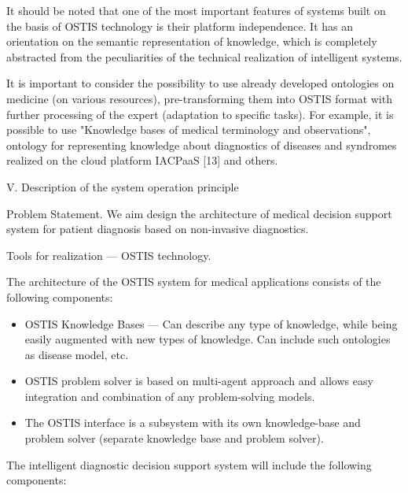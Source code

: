 \documentclass[twocolumn]{scndocument}
\begin{document}
It should be noted that one of the most important
features of systems built on the basis of OSTIS technology is their platform independence. It has an orientation
on the semantic representation of knowledge, which
is completely abstracted from the peculiarities of the
technical realization of intelligent systems.

It is important to consider the possibility to use already
developed ontologies on medicine (on various resources),
pre-transforming them into OSTIS format with further
processing of the expert (adaptation to specific tasks).
For example, it is possible to use "Knowledge bases
of medical terminology and observations", ontology for
representing knowledge about diagnostics of diseases and
syndromes realized on the cloud platform IACPaaS [13]
and others.

\begin{center}
\vspace{-3pt}
V. Description of the system operation principle
\vspace{-3pt}
\end{center}

Problem Statement. We aim design the architecture
of medical decision support system for patient diagnosis
based on non-invasive diagnostics.

Tools for realization — OSTIS technology.

The architecture of the OSTIS system for medical
applications consists of the following components:

\vspace{-5pt}
\begin{itemize}
    \setlength{\itemsep}{-3pt} 
    \setlength{\parsep}{-3pt}
    \item OSTIS Knowledge Bases — Can describe any type
of knowledge, while being easily augmented with
new types of knowledge. Can include such ontologies as disease model, etc.
    \item OSTIS problem solver is based on multi-agent approach and allows easy integration and combination
of any problem-solving models.
    \item The OSTIS interface is a subsystem with its
own knowledge-base and problem solver (separate
knowledge base and problem solver).
\end{itemize}
\vspace{-5pt}

The intelligent diagnostic decision support system will
include the following components:
\end{document}
